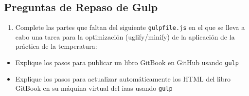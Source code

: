 \subsection{Preguntas de Repaso de
Gulp}\label{preguntas-de-repaso-de-gulp}

\begin{enumerate}
\def\labelenumi{\arabic{enumi}.}
\itemsep1pt\parskip0pt
\item
  Complete las partes que faltan del siguiente \texttt{gulpfile.js} en
  el que se lleva a cabo una tarea para la optimización (uglify/minify)
  de la aplicación de la práctica de la temperatura:
\end{enumerate}

\begin{Shaded}
\begin{Highlighting}[]
\NormalTok{(karma)]$ cat }
 \NormalTok{(}\NormalTok{),}
    \NormalTok{(}\NormalTok{),}
    \NormalTok{(}\NormalTok{),}
    \NormalTok{(}\NormalTok{);}
 \NormalTok{(}\NormalTok{);}
 \NormalTok{(}\NormalTok{);}

\FunctionTok{____}\NormalTok{(}\NormalTok{, } \NormalTok{() \{}
  \FunctionTok{___}\NormalTok{(}\NormalTok{)}
  \FunctionTok{____}\NormalTok{(}\NormalTok{())}
  \FunctionTok{___}\NormalTok{(}\FunctionTok{____}\NormalTok{(}\NormalTok{));}

  \FunctionTok{__}\NormalTok{(}\NormalTok{)}
    \FunctionTok{___}\NormalTok{(}\NormalTok{())}
    \FunctionTok{___}\NormalTok{(}\FunctionTok{___}\NormalTok{(}\NormalTok{))}

  \FunctionTok{__}\NormalTok{(}\NormalTok{)}
   \FunctionTok{___}\NormalTok{(}\NormalTok{(\{}\NormalTok{:}\NormalTok{\}))}
   \FunctionTok{___}\NormalTok{(}\FunctionTok{___}\NormalTok{(}\NormalTok{))}
        \NormalTok{\});}
\end{Highlighting}
\end{Shaded}

\begin{itemize}
\itemsep1pt\parskip0pt
\item
  Explique los pasos para publicar un libro GitBook en GitHub usando
  \texttt{gulp}
\item
  Explique los pasos para actualizar automáticamente los HTML del libro
  GitBook en su máquina virtual del iaas usando \texttt{gulp}
\end{itemize}
